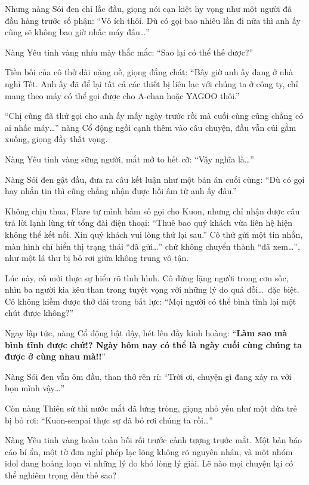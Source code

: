 \documentclass[../main.tex]{subfiles}
\begin{document}
Nhưng nàng Sói đen chỉ lắc đầu, giọng nói cạn kiệt hy vọng như một người đã đầu hàng trước số phận: ``Vô ích thôi. Dù có gọi bao nhiêu lần đi nữa thì anh ấy cũng sẽ không bao giờ nhấc máy đâu\dots''

Nàng Yêu tinh vàng nhíu mày thắc mắc: ``Sao lại có thể thế được?''

Tiền bối của cô thở dài nặng nề, giọng đắng chát: ``Bây giờ anh ấy đang ở nhà nghỉ Tết. Anh ấy đã để lại tất cả các thiết bị liên lạc với chúng ta ở công ty, chỉ mang theo máy có thể gọi được cho A-chan hoặc YAGOO thôi.''

``Chị cũng đã thử gọi cho anh ấy mấy ngày trước rồi mà cuối cùng cũng chẳng có ai nhấc máy\dots'' nàng Cổ động ngồi cạnh thêm vào câu chuyện, đầu vẫn cúi gằm xuống, giọng đầy thất vọng.

Nàng Yêu tinh vàng sững người, mắt mở to hết cỡ: ``Vậy nghĩa là\dots''

Nàng Sói đen gật đầu, đưa ra câu kết luận như một bản án cuối cùng: ``Dù có gọi hay nhắn tin thì cũng chẳng nhận được hồi âm từ anh ấy đâu.''

Không chịu thua, Flare tự mình bấm số gọi cho Kuon, nhưng chỉ nhận được câu trả lời lạnh lùng từ tổng đài điện thoại: ``Thuê bao quý khách vừa liên hệ hiện không thể kết nối. Xin quý khách vui lòng thử lại sau.'' Cô thử gửi một tin nhắn, màn hình chỉ hiển thị trạng thái ``đã gửi\dots'' chứ không chuyển thành ``đã xem\dots'', như một lá thư bị bỏ rơi giữa không trung vô tận.

Lúc này, cô mới thực sự hiểu rõ tình hình. Cô đứng lặng người trong cơn sốc, nhìn ba người kia kêu than trong tuyệt vọng với những lý do quá đỗi\dots\ đặc biệt. Cô không kiềm được thở dài trong bất lực: ``Mọi người có thể bình tĩnh lại một chút được không?''

Ngay lập tức, nàng Cổ động bật dậy, hét lên đầy kinh hoàng: ``\textbf{Làm sao mà bình tĩnh được chứ!? Ngày hôm nay có thể là ngày cuối cùng chúng ta được ở cùng nhau mà!!}''

Nàng Sói đen vẫn ôm đầu, than thở rên rỉ: ``Trời ơi, chuyện gì đang xảy ra với bọn mình vậy\dots''

Còn nàng Thiên sứ thì nước mắt đã lưng tròng, giọng nhỏ yếu như một đứa trẻ bị bỏ rơi: ``Kuon-senpai thực sự đã bỏ rơi chúng ta rồi\dots''

Nàng Yêu tinh vàng hoàn toàn bối rối trước cảnh tượng trước mắt. Một bản báo cáo bí ẩn, một tờ đơn nghỉ phép lạc lõng không rõ nguyên nhân, và một nhóm idol đang hoảng loạn vì những lý do khó lòng lý giải. Lẽ nào mọi chuyện lại có thể nghiêm trọng đến thế sao?
\end{document}
